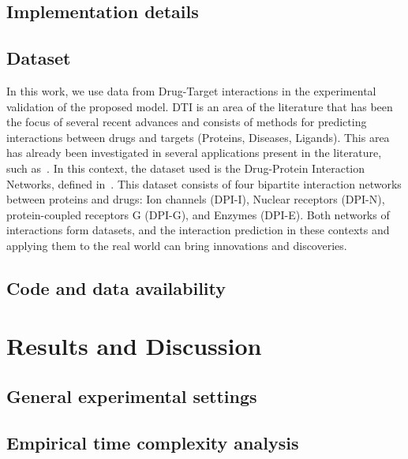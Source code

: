 
\algBuildTree
\algPredict
\algFindBestSplit
\algFindRandomSplit
\algFindBipartiteSplit


\subsection{Implementation details}


\subsection{Dataset}
In this work, we use data from Drug-Target interactions in the experimental validation of the proposed model. DTI is an area of the literature that has been the focus of several recent advances and consists of methods for predicting interactions between drugs and targets (Proteins, Diseases, Ligands). This area has already been investigated in several applications present in the literature, such as~\cite{Fattahi2019,Nasution2019}. In this context, the dataset used is the Drug-Protein Interaction Networks, defined in~\cite{Yamanishi2008}. This dataset consists of four bipartite interaction networks between proteins and drugs: Ion channels (DPI-I), Nuclear receptors (DPI-N), protein-coupled receptors G (DPI-G), and Enzymes (DPI-E). Both networks of interactions form datasets, and the interaction prediction in these contexts and applying them to the real world can bring innovations and discoveries.

\subsection{Code and data availability}

\section{Results and Discussion}

\subsection{General experimental settings}


\subsection{Empirical time complexity analysis}
\label{sec:empirical_complexity}

